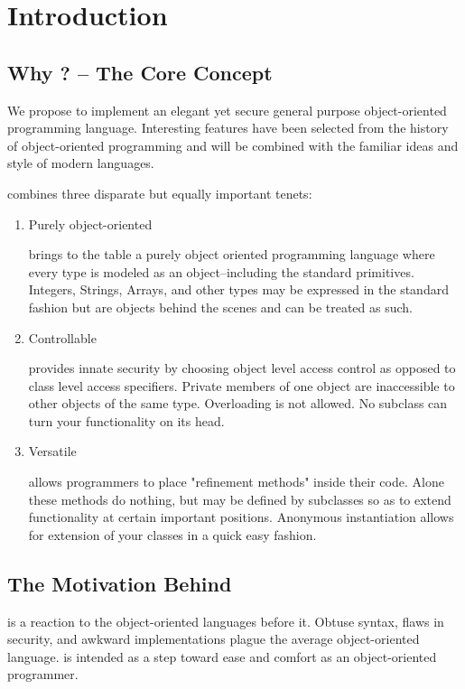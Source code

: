 \section{Introduction}
\subsection{Why \Lang{}? -- The Core Concept}
We propose to implement an elegant yet secure general purpose object-oriented programming language. Interesting features have been selected from the history of object-oriented programming and will be combined with the familiar ideas and style of modern languages.

\Lang{} combines three disparate but equally important tenets:


\begin{enumerate}
\item{Purely object-oriented 
    
    \Lang{} brings to the table a purely object oriented programming language where every type is
    modeled as an object--including the standard primitives. Integers, Strings, Arrays, and other types may be expressed in the standard fashion but are objects behind the scenes and can be treated as such.}

\item{Controllable

   \Lang{} provides innate security by choosing object level access
   control as opposed to class level access specifiers. Private members of one object
   are inaccessible to other objects of the same type. Overloading is not allowed.
   No subclass can turn your functionality on its head.}

\item{Versatile

    \Lang{} allows programmers to place "refinement methods" inside their code.
    Alone these methods do nothing, but may be defined by subclasses so as to extend
    functionality at certain important positions. Anonymous instantiation allows for
    extension of your classes in a quick easy fashion.}
\end{enumerate}

\subsection{ The Motivation Behind \Lang{}}
\Lang{} is a reaction to the object-oriented languages before it.
Obtuse syntax, flaws in security, and awkward implementations plague
the average object-oriented language. \Lang{} is intended as a step
toward ease and comfort as an object-oriented programmer.


